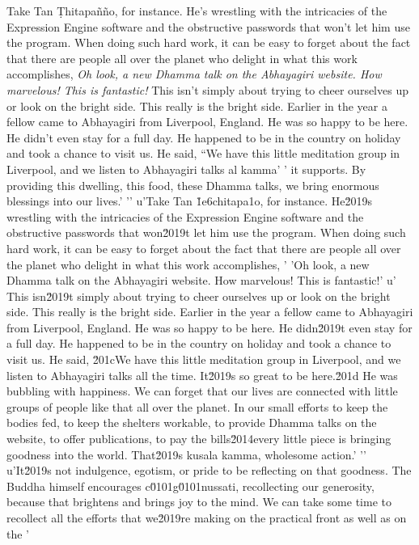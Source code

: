 Take Tan Ṭhitapañño, for instance. He's wrestling with the 
intricacies of the Expression Engine software and the obstructive 
passwords that won't let him use the program. When doing such hard 
work, it can be easy to forget about the fact that there are people all 
over the planet who delight in what this work accomplishes, \emph{Oh 
look, a new Dhamma talk on the Abhayagiri website. How marvelous! This 
is fantastic!} This isn't simply about trying to cheer ourselves up or 
look on the bright side. This really is the bright side. Earlier in the 
year a fellow came to Abhayagiri from Liverpool, England. He was so 
happy to be here. He didn't even stay for a full day. He happened to be 
in the country on holiday and took a chance to visit us. He said, ``We 
have this little meditation group in Liverpool, and we listen to 
Abhayagiri talks al kamma'
' it supports. By providing this dwelling, this food, these Dhamma talks, we bring enormous blessings into our lives.'
'\n'
u'Take Tan \u1e6chitapa\xf1o, for instance. He\u2019s wrestling with the intricacies of the Expression Engine software and the obstructive passwords that won\u2019t let him use the program. When doing such hard work, it can be easy to forget about the fact that there are people all over the planet who delight in what this work accomplishes, '
'Oh look, a new Dhamma talk on the Abhayagiri website. How marvelous! This is fantastic!'
u' This isn\u2019t simply about trying to cheer ourselves up or look on the bright side. This really is the bright side. Earlier in the year a fellow came to Abhayagiri from Liverpool, England. He was so happy to be here. He didn\u2019t even stay for a full day. He happened to be in the country on holiday and took a chance to visit us. He said, \u201cWe have this little meditation group in Liverpool, and we listen to Abhayagiri talks all the time. It\u2019s so great to be here.\u201d He was bubbling with happiness. We can forget that our lives are connected with little groups of people like that all over the planet. In our small efforts to keep the bodies fed, to keep the shelters workable, to provide Dhamma talks on the website, to offer publications, to pay the bills\u2014every little piece is bringing goodness into the world. That\u2019s kusala kamma, wholesome action.'
'\n'
u'It\u2019s not indulgence, egotism, or pride to be reflecting on that goodness. The Buddha himself encourages c\u0101g\u0101nussati, recollecting our generosity, because that brightens and brings joy to the mind. We can take some time to recollect all the efforts that we\u2019re making on the practical front as well as on the '
